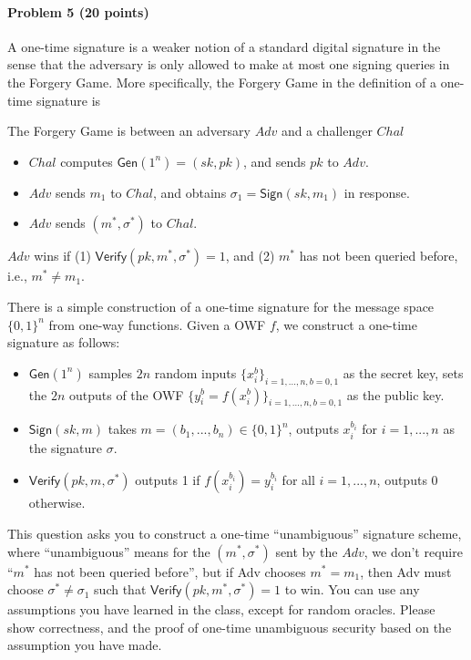 \paragraph{Problem 5 (20 points)}
A one-time signature is a weaker notion of a standard digital signature in the sense that the adversary is only allowed to make at most one signing queries in the Forgery Game. More specifically, the Forgery Game in the definition of a one-time signature is

\begin{definition}
The Forgery Game is between an adversary $Adv$ and a challenger $Chal$
\begin{itemize}
    \item $Chal$ computes $\mathsf{Gen}(1^n)=(sk,pk)$, and sends $pk$ to $Adv$.
    \item $Adv$ sends $m_1$ to $Chal$, and obtains $\sigma_1=\mathsf{Sign}(sk, m_1)$ in response.
    \item $Adv$ sends $(m^*, \sigma^*)$ to $Chal$.
\end{itemize}
$Adv$ wins if (1) $\mathsf{Verify}(pk, m^*,\sigma^*) = 1$, and (2) $m^*$ has not been queried before, i.e., $m^*\neq m_1$. 
\end{definition}

There is a simple construction of a one-time signature for the message space $\{0, 1\}^n$ from one-way functions. Given a OWF $f$, we construct a one-time signature as follows:
\begin{itemize}
    \item $\mathsf{Gen}(1^n)$ samples $2n$ random inputs $\{ x_i^b \}_{ i = 1, ..., n, b = 0,1}$ as the secret key, sets the $2n$ outputs of the OWF $\{ y_i^b = f(x_i^b) \}_{ i = 1, ..., n, b = 0,1}$ as the public key.
    \item $\mathsf{Sign}(sk, m)$ takes $m =(b_1, ..., b_n) \in \{0, 1\}^n$, outputs $x_i^{b_i}$ for $i = 1, ..., n$ as the signature $\sigma$. 
    \item $\mathsf{Verify}(pk, m,\sigma^*)$ outputs 1 if $f(x_i^{b_i}) = y_i^{b_i}$ for all $i = 1, ..., n$, outputs 0 otherwise. 
\end{itemize}


This question asks you to construct a one-time ``unambiguous'' signature scheme, where ``unambiguous'' means for the $(m^*, \sigma^*)$ sent by the $Adv$, we don't require ``$m^*$ has not been queried before'', but if Adv chooses $m^* = m_1$, then Adv must choose $\sigma^*\neq \sigma_1$ such that $\mathsf{Verify}(pk, m^*,\sigma^*) = 1$ to win. 
You can use any assumptions you have learned in the class, except for random oracles. Please show correctness, and the proof of one-time unambiguous security based on the assumption you have made.
